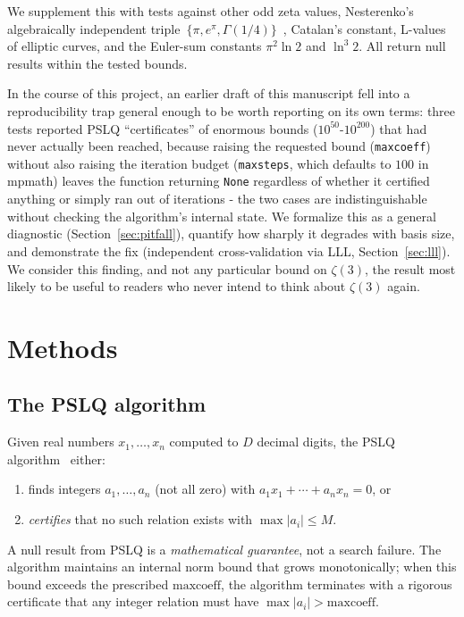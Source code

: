 \documentclass[12pt]{article}
\theoremstyle{definition}
\theoremstyle{remark}
\begin{document}
We supplement this with tests against other odd zeta values,
Nesterenko's algebraically independent
triple~$\{\pi,e^\pi,\Gamma(1/4)\}$~\cite{Nesterenko1996},
Catalan's constant, L-values of elliptic curves, and the Euler-sum
constants $\pi^2\ln 2$ and $\ln^{3} 2$.  All return null results within
the tested bounds.

In the course of this project, an earlier draft of this manuscript
fell into a reproducibility trap general enough to be worth reporting
on its own terms: three tests reported PSLQ ``certificates'' of
enormous bounds ($10^{50}$-$10^{200}$) that had never actually been
reached, because raising the requested bound
(\texttt{maxcoeff}) without also raising the iteration budget
(\texttt{maxsteps}, which defaults to $100$ in mpmath) leaves the
function returning \texttt{None} regardless of whether it certified
anything or simply ran out of iterations - the two cases are
indistinguishable without checking the algorithm's internal state.  We
formalize this as a general diagnostic
(Section~\ref{sec:pitfall}), quantify how sharply it degrades with
basis size, and demonstrate the fix (independent cross-validation via
LLL, Section~\ref{sec:lll}).  We consider this finding, and not any
particular bound on $\zeta(3)$, the result most likely to be useful to
readers who never intend to think about $\zeta(3)$ again.


\section{Methods}\label{sec:methods}

\subsection{The PSLQ algorithm}\label{sec:pslq}

Given real numbers $x_1,\ldots,x_n$ computed to $D$ decimal digits,
the PSLQ algorithm~\cite{Ferguson1992, FergusonBaileyArwade1999}
either:
\begin{enumerate}[label=(\alph*)]
  \item finds integers $a_1,\ldots,a_n$ (not all zero) with
    $a_1 x_1 + \cdots + a_n x_n = 0$, or
  \item \emph{certifies} that no such relation exists with
    $\max|a_i|\le M$.
\end{enumerate}
A null result from PSLQ is a \emph{mathematical guarantee}, not a
search failure.  The algorithm maintains an internal norm bound that
grows monotonically; when this bound exceeds the prescribed
$\mathrm{maxcoeff}$, the algorithm terminates with a rigorous
certificate that any integer relation must have
$\max|a_i|>\mathrm{maxcoeff}$.
\end{document}
